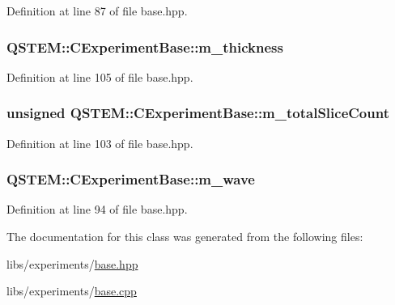Definition at line 87 of file base.\-hpp.

\hypertarget{class_q_s_t_e_m_1_1_c_experiment_base_ae72bcad8e8c1fdc0f960abaf62712c35}{
\subsubsection[{m\-\_\-thickness}]{ Q\-S\-T\-E\-M\-::\-C\-Experiment\-Base\-::m\-\_\-thickness\hspace{0.3cm}{\ttfamily [protected]}}}\label{class_q_s_t_e_m_1_1_c_experiment_base_ae72bcad8e8c1fdc0f960abaf62712c35}


Definition at line 105 of file base.\-hpp.

\hypertarget{class_q_s_t_e_m_1_1_c_experiment_base_a822e2b526bf15d944265a05eb9c7680c}{
\subsubsection[{m\-\_\-total\-Slice\-Count}]{\setlength{\rightskip}{0pt plus 5cm}unsigned Q\-S\-T\-E\-M\-::\-C\-Experiment\-Base\-::m\-\_\-total\-Slice\-Count\hspace{0.3cm}{\ttfamily [protected]}}}\label{class_q_s_t_e_m_1_1_c_experiment_base_a822e2b526bf15d944265a05eb9c7680c}


Definition at line 103 of file base.\-hpp.

\hypertarget{class_q_s_t_e_m_1_1_c_experiment_base_aab50b5afb7b9387ec1c74d0e11fcbce4}{
\subsubsection[{m\-\_\-wave}]{ Q\-S\-T\-E\-M\-::\-C\-Experiment\-Base\-::m\-\_\-wave\hspace{0.3cm}{\ttfamily [protected]}}}\label{class_q_s_t_e_m_1_1_c_experiment_base_aab50b5afb7b9387ec1c74d0e11fcbce4}


Definition at line 94 of file base.\-hpp.



The documentation for this class was generated from the following files\-:\begin{DoxyCompactItemize}
\item 
libs/experiments/\hyperlink{base_8hpp}{base.\-hpp}\item 
libs/experiments/\hyperlink{base_8cpp}{base.\-cpp}\end{DoxyCompactItemize}
